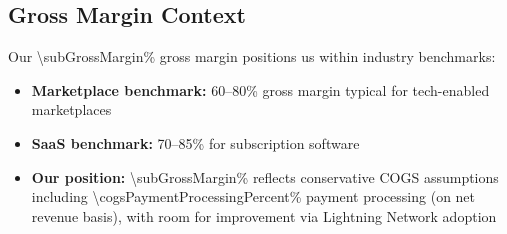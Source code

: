 \subsection{Gross Margin Context}
Our \num{\subGrossMargin}\% gross margin positions us within industry benchmarks:
\begin{itemize}
    \item \textbf{Marketplace benchmark:} 60--80\% gross margin typical for tech-enabled marketplaces\cite{andreessen2020}
    \item \textbf{SaaS benchmark:} 70--85\% for subscription software\cite{openview2023}
    \item \textbf{Our position:} \num{\subGrossMargin}\% reflects conservative COGS assumptions including \num{\cogsPaymentProcessingPercent}\% payment processing (on net revenue basis), with room for improvement via Lightning Network adoption
\end{itemize}
